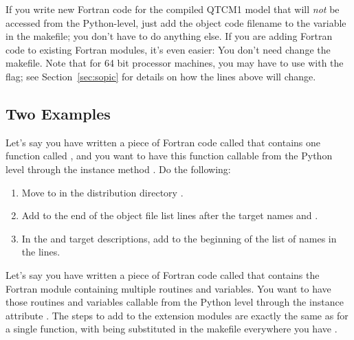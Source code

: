 If you write new Fortran code for the compiled QTCM1 model that
will \emph{not} be accessed from the Python-level, just add the
object code filename to the variable  in the
makefile; you don't have to do anything else.  If you are adding
Fortran code to existing Fortran modules, it's even easier:  You
don't need change the makefile.  Note that for 64 bit processor
machines, you may have to use  with the  flag;
see Section~\ref{sec:sopic} for details on how the lines above will
change.


	\subsection{Two Examples}

Let's say you have written a piece of Fortran code called
 that contains one function called
, and you want to have this function
callable from the Python level through the  
instance method .  Do the following:

\begin{enumerate}
\item Move  to  in the 
	distribution directory .

\item Add  to the end of the object file list lines
	after the target names
	 and
	.

\item In the
	 and
	 target descriptions,
	add  to the 
	beginning of the list of  names 
	in the  lines.
\end{enumerate}


Let's say you have written a piece of Fortran code called
 that contains the Fortran module 
containing multiple routines and variables.  You want to have those
routines and variables callable from the Python level through the
 instance attribute .  The steps
to add  to the extension modules are exactly the
same as for a single function, with  being
substituted in the makefile everywhere you have .




